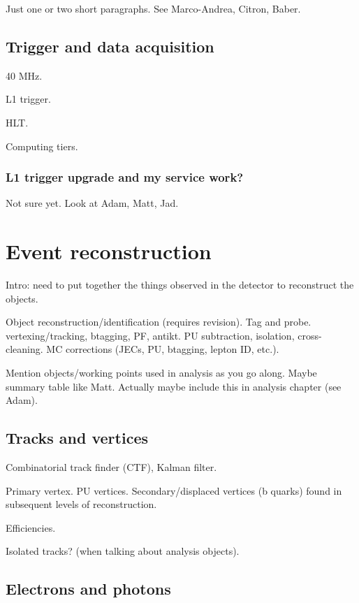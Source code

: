 Just one or two short paragraphs.
See Marco-Andrea, Citron, Baber.

\subsection{Trigger and data acquisition}

40 MHz.

L1 trigger.

HLT.

Computing tiers.

\subsubsection{L1 trigger upgrade and my service work?}

Not sure yet. Look at Adam, Matt, Jad.

\section{Event reconstruction}
\label{sec:detector-reconstruction}

Intro: need to put together the things observed in the detector to reconstruct 
the objects.

Object reconstruction/identification (requires revision).
Tag and probe.
vertexing/tracking, btagging, PF, antikt.
PU subtraction, isolation, cross-cleaning.
MC corrections (JECs, PU, btagging, lepton ID, etc.).

Mention objects/working points used in analysis as you go along. Maybe summary 
table like Matt. Actually maybe include this in analysis chapter (see Adam).

\subsection{Tracks and vertices}

Combinatorial track finder (CTF), Kalman filter.

Primary vertex. PU vertices. Secondary/displaced vertices (b quarks) found in 
subsequent levels of reconstruction.

Efficiencies.

Isolated tracks? (when talking about analysis objects).

\subsection{Electrons and photons}

